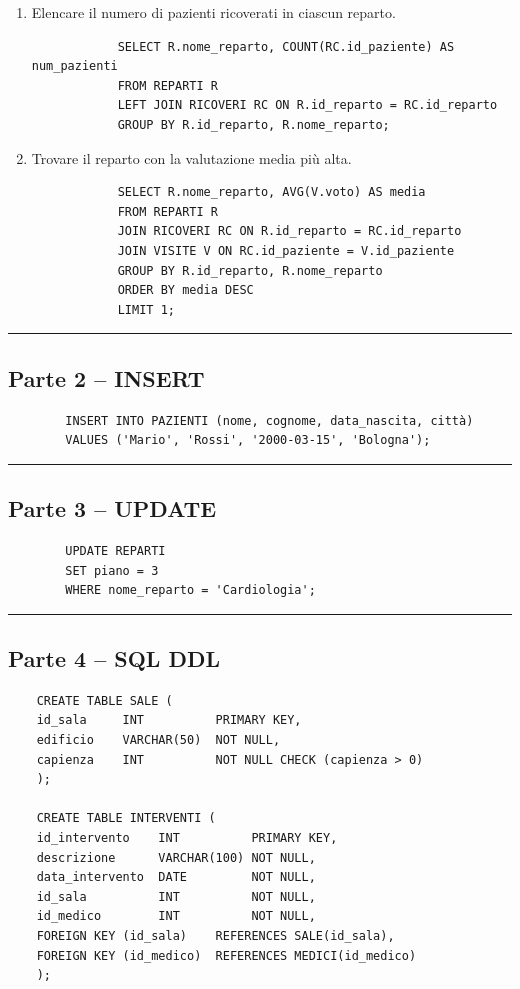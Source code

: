 \documentclass[a4paper,12pt]{article}
\begin{document}
\begin{enumerate}
		\item Elencare il numero di pazienti ricoverati
		in ciascun reparto.
		\begin{verbatim}
			SELECT R.nome_reparto, COUNT(RC.id_paziente) AS num_pazienti
			FROM REPARTI R
			LEFT JOIN RICOVERI RC ON R.id_reparto = RC.id_reparto
			GROUP BY R.id_reparto, R.nome_reparto;
		\end{verbatim}
		
		\item Trovare il reparto con la valutazione media più alta.
		\begin{verbatim}
			SELECT R.nome_reparto, AVG(V.voto) AS media
			FROM REPARTI R
			JOIN RICOVERI RC ON R.id_reparto = RC.id_reparto
			JOIN VISITE V ON RC.id_paziente = V.id_paziente
			GROUP BY R.id_reparto, R.nome_reparto
			ORDER BY media DESC
			LIMIT 1;
		\end{verbatim}
		
	\end{enumerate}
	
	\noindent\rule{\linewidth}{0.4pt}
	
	\subsection*{Parte 2 -- INSERT}
	
	\begin{verbatim}
		INSERT INTO PAZIENTI (nome, cognome, data_nascita, città)
		VALUES ('Mario', 'Rossi', '2000-03-15', 'Bologna');
	\end{verbatim}
	
	\noindent\rule{\linewidth}{0.4pt}
	
	\subsection*{Parte 3 -- UPDATE}
	
	\begin{verbatim}
		UPDATE REPARTI
		SET piano = 3
		WHERE nome_reparto = 'Cardiologia';
	\end{verbatim}
	
	\noindent\rule{\linewidth}{0.4pt}
	
	\subsection*{Parte 4 -- SQL DDL}
	
\begin{verbatim}
	CREATE TABLE SALE (
	id_sala     INT          PRIMARY KEY,
	edificio    VARCHAR(50)  NOT NULL,
	capienza    INT          NOT NULL CHECK (capienza > 0)
	);
	
	CREATE TABLE INTERVENTI (
	id_intervento    INT          PRIMARY KEY,
	descrizione      VARCHAR(100) NOT NULL,
	data_intervento  DATE         NOT NULL,
	id_sala          INT          NOT NULL,
	id_medico        INT          NOT NULL,
	FOREIGN KEY (id_sala)    REFERENCES SALE(id_sala),
	FOREIGN KEY (id_medico)  REFERENCES MEDICI(id_medico)
	);
\end{verbatim}
	
\end{document}
